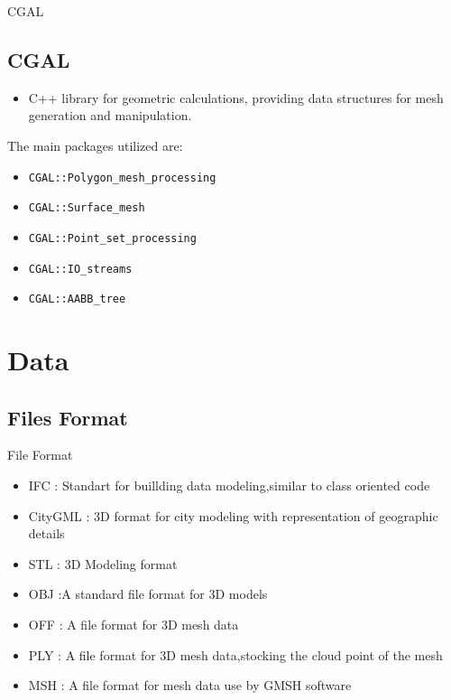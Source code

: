 \documentclass[10pt]{beamer}
\begin{document}
\begin{frame}{CGAL}
    \subsection{CGAL}
    \begin{itemize}
        \item C++ library for geometric calculations, providing data structures for mesh generation and manipulation.
    \end{itemize}
    \vspace{0.5cm}
    The main packages utilized are:
    \begin{itemize}
        \item \texttt{CGAL::Polygon\_mesh\_processing}
        \item \texttt{CGAL::Surface\_mesh}
        \item \texttt{CGAL::Point\_set\_processing}
        \item \texttt{CGAL::IO\_streams}
        \item \texttt{CGAL::AABB\_tree}
    \end{itemize}
    
\end{frame}


\section{Data}
\subsection{Files Format}
\begin{frame}{File Format}
\begin{itemize}
    \item IFC : Standart for buillding data modeling,similar to class oriented code
    \item CityGML : 3D format for city modeling with representation of geographic details
    \item STL : 3D Modeling format 
    \item OBJ :A standard file format for 3D models
    \item OFF :  A file format for 3D mesh data
    \item PLY :  A file format for 3D mesh data,stocking the cloud point of the mesh 
    \item MSH : A file format for mesh data use by GMSH software
\end{itemize}
\end{frame}
\end{document}
